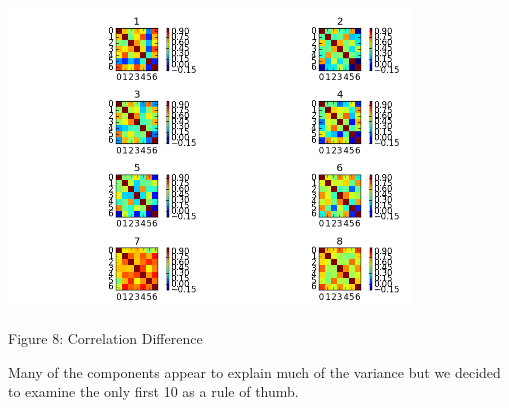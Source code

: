 \documentclass[12pt]{article}
\begin{document}
\begin{housevseverything}
    \centering
      \includegraphics[width=0.8\textwidth]{correlation_difference}
    \caption{Figure 8: Correlation Difference}
\end{housevseverything}

Many of the  components appear to explain much of the variance but we decided 
to examine the only first 10 as a rule of thumb.
\end{document}
